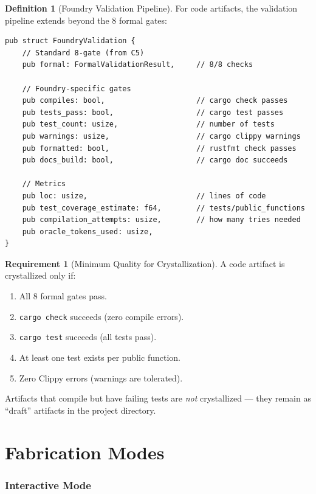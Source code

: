 \documentclass[11pt,a4paper,twoside]{article}
\theoremstyle{definition}
\newtheorem{definition}{Definition}[section]
\newtheorem{requirement}{Requirement}[section]
\theoremstyle{plain}
\theoremstyle{remark}
\begin{document}
\begin{definition}[Foundry Validation Pipeline]\label{def:foundryval}
For code artifacts, the validation pipeline extends beyond the 8
formal gates:
\begin{lstlisting}
pub struct FoundryValidation {
    // Standard 8-gate (from C5)
    pub formal: FormalValidationResult,     // 8/8 checks

    // Foundry-specific gates
    pub compiles: bool,                     // cargo check passes
    pub tests_pass: bool,                   // cargo test passes
    pub test_count: usize,                  // number of tests
    pub warnings: usize,                    // cargo clippy warnings
    pub formatted: bool,                    // rustfmt check passes
    pub docs_build: bool,                   // cargo doc succeeds

    // Metrics
    pub loc: usize,                         // lines of code
    pub test_coverage_estimate: f64,        // tests/public_functions
    pub compilation_attempts: usize,        // how many tries needed
    pub oracle_tokens_used: usize,
}
\end{lstlisting}
\end{definition}

\begin{requirement}[Minimum Quality for Crystallization]\label{req:minqual}
A code artifact is crystallized only if:
\begin{enumerate}[nosep]
  \item All 8 formal gates pass.
  \item \texttt{cargo check} succeeds (zero compile errors).
  \item \texttt{cargo test} succeeds (all tests pass).
  \item At least one test exists per public function.
  \item Zero Clippy errors (warnings are tolerated).
\end{enumerate}
Artifacts that compile but have failing tests are \emph{not}
crystallized --- they remain as ``draft'' artifacts in the project
directory.
\end{requirement}


\part{Fabrication Modes}\label{part:modes}

\section{Interactive Mode}\label{sec:interactive}
\end{document}
